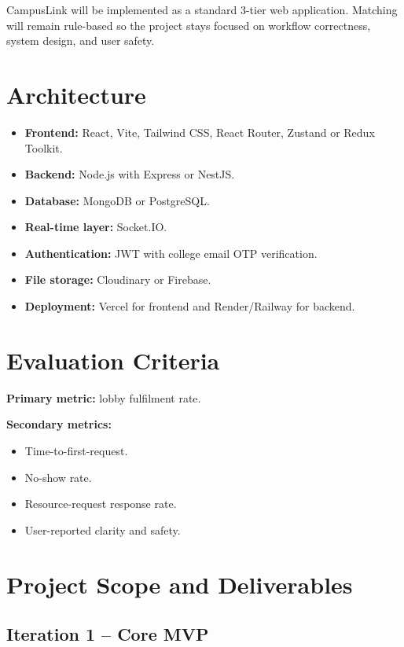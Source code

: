 \documentclass[12pt,a4paper]{article}
\begin{document}
CampusLink will be implemented as a standard 3-tier web application. Matching will remain rule-based so the project stays focused on workflow correctness, system design, and user safety.

\section{Architecture}

\begin{itemize}[leftmargin=*]
  \item \textbf{Frontend:} React, Vite, Tailwind CSS, React Router, Zustand or Redux Toolkit.
  \item \textbf{Backend:} Node.js with Express or NestJS.
  \item \textbf{Database:} MongoDB or PostgreSQL.
  \item \textbf{Real-time layer:} Socket.IO.
  \item \textbf{Authentication:} JWT with college email OTP verification.
  \item \textbf{File storage:} Cloudinary or Firebase.
  \item \textbf{Deployment:} Vercel for frontend and Render/Railway for backend.
\end{itemize}

\section{Evaluation Criteria}

\textbf{Primary metric:} lobby fulfilment rate.

\textbf{Secondary metrics:}
\begin{itemize}[leftmargin=*]
  \item Time-to-first-request.
  \item No-show rate.
  \item Resource-request response rate.
  \item User-reported clarity and safety.
\end{itemize}

\section{Project Scope and Deliverables}

\subsection{Iteration 1 -- Core MVP}
\end{document}
